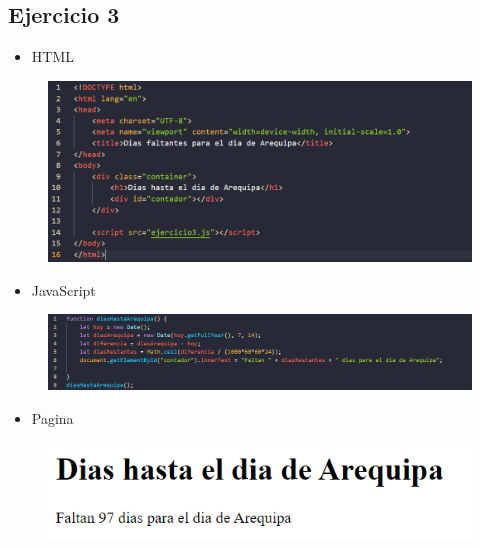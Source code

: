 \documentclass{article}
\begin{document}
	\subsection{Ejercicio 3}
	\begin{itemize}
		\item HTML
	\end{itemize}
	\begin{figure}[H]
		\centering
		\includegraphics[width=1.0\textwidth, keepaspectratio]{img/ejercicio3a}
	\end{figure}
	\begin{itemize}
		\item JavaScript
	\end{itemize}
	\begin{figure}[H]
		\centering
		\includegraphics[width=1.0\textwidth, keepaspectratio]{img/ejercicio3b}
	\end{figure}
	\begin{itemize}
		\item Pagina
	\end{itemize}
	\begin{figure}[H]
		\centering
		\includegraphics[width=1.0\textwidth, keepaspectratio]{img/ejercicio3c}
	\end{figure}
	
\end{document}
